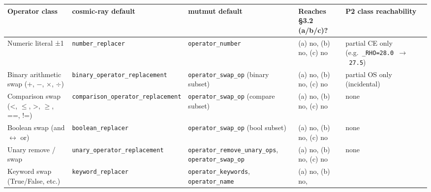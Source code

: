 \documentclass[review,12pt,authoryear]{elsarticle}
\newcounter{none}                   %
\begin{document}
{\def\LTcaptype{none} %
\begin{longtable}[]{@{}
  >{\raggedright\arraybackslash}p{}
  >{\raggedright\arraybackslash}p{}
  >{\raggedright\arraybackslash}p{}
  >{\raggedright\arraybackslash}p{}
  >{\raggedright\arraybackslash}p{}@{}}
\toprule\noalign{}
\begin{minipage}[b]{\linewidth}\raggedright
Operator class
\end{minipage} & \begin{minipage}[b]{\linewidth}\raggedright
cosmic-ray default
\end{minipage} & \begin{minipage}[b]{\linewidth}\raggedright
mutmut default
\end{minipage} & \begin{minipage}[b]{\linewidth}\raggedright
Reaches §3.2 (a/b/c)?
\end{minipage} & \begin{minipage}[b]{\linewidth}\raggedright
P2 class reachability
\end{minipage} \\
\midrule\noalign{}
\endhead
\bottomrule\noalign{}
\endlastfoot
Numeric literal ±1 & \texttt{number\_replacer} &
\texttt{operator\_number} & (a) no, (b) no, (c) no & partial CE only
(e.g.~\texttt{\_RHO=28.0\ $\to$\ 27.5}) \\
Binary arithmetic swap (+, −, $\times$, $\div$) &
\texttt{binary\_operator\_replacement} & \texttt{operator\_swap\_op}
(binary subset) & (a) no, (b) no, (c) no & partial OS only
(incidental) \\
Comparison swap (\textless, $\leq$, \textgreater, $\geq$, ==, !=) &
\texttt{comparison\_operator\_replacement} & \texttt{operator\_swap\_op}
(compare subset) & (a) no, (b) no, (c) no & none \\
Boolean swap (and $\leftrightarrow$ or) & \texttt{boolean\_replacer} &
\texttt{operator\_swap\_op} (bool subset) & (a) no, (b) no, (c) no &
none \\
Unary remove / swap & \texttt{unary\_operator\_replacement} &
\texttt{operator\_remove\_unary\_ops}, \texttt{operator\_swap\_op} & (a)
no, (b) no, (c) no & none \\
Keyword swap (True/False, etc.) & \texttt{keyword\_replacer} &
\texttt{operator\_keywords}, \texttt{operator\_name} & (a) no, (b) no,

\end{longtable}}
\end{document}
